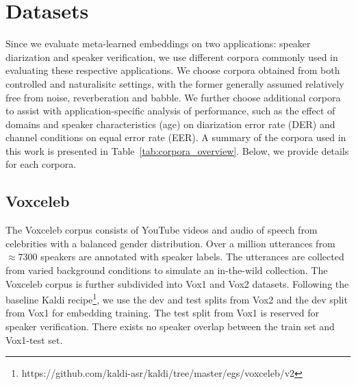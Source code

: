 \section{Datasets}
\label{sec:dataset}

Since we evaluate meta-learned embeddings on two applications: speaker diarization and speaker verification, we use different corpora commonly used in evaluating these respective applications. We choose corpora obtained from both controlled and naturalisitc settings, with the former generally assumed relatively free from noise, reverberation and babble. We further choose additional corpora to assist with application-specific analysis of performance, such as the effect of domains and speaker characteristics (age) on diarization error rate (DER) and channel conditions on equal error rate (EER). A summary of the corpora used in this work is presented in Table~\ref{tab:corpora_overview}. Below, we provide details for each corpora.

\begin{table}[h]
\caption{Overview of training and evaluation corpora}
\label{tab:corpora_overview}
\end{table}


\subsection{Voxceleb}
\label{subsec:data_vox}
The Voxceleb corpus \cite{chung2018Voxceleb2} consists of YouTube videos and audio of speech from celebrities with a balanced gender distribution. Over a million utterances from $\approx$7300 speakers are annotated with speaker labels. The utterances are collected from varied background conditions to simulate an in-the-wild collection. The Voxceleb corpus is further subdivided into Vox1 and Vox2 datasets. Following the baseline Kaldi recipe\footnote{https://github.com/kaldi-asr/kaldi/tree/master/egs/voxceleb/v2}, we use the dev and test splits from Vox2 and the dev split from Vox1 for embedding training. The test split from Vox1 is reserved for speaker verification. There exists no speaker overlap between the train set and Vox1-test set.

